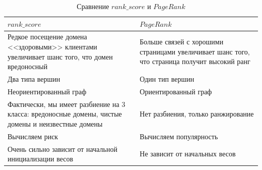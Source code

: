 \documentclass[a4paper,14pt]{extreport} %
\begin{document}
\begin{table}[H]
\caption{Сравнение $rank\_score$ и $PageRank$}\label{tab:pr}
\begin{tabular}{|p{8cm}|p{8cm}|}

	\hline
	$rank\_score$                                                                                                                                                                       & $PageRank$                                                                                                                                                                  \\ \hline
	Редкое посещение домена <<здоровыми>> клиентами увеличивает шанс того, что домен вредоносный           & Больше связей с хорошими страницами увеличивает шанс того, что страница получит высокий ранг \\ \hline 
	Два типа вершин                                                                                                                                                        & Один тип вершин                                                                                                                                                \\ \hline
	Неориентированный граф                                                                                                                                         & Ориентированный граф                                                                                                                                     \\ \hline
	Фактически, мы имеет разбиение на 3 класса: вредоносные домены, чистые домены и неизвестные домены & Нет разбиения, только ранжирование                                                                                                            \\ \hline
	Вычисляем риск                                                                                                                                                         & Вычисляем популярность                                                                                                                                 \\ \hline
	Очень сильно зависит от начальной инициализации весов                                                                                & Не зависит от начальных весов                                                                                                                      \\ \hline
\end{tabular}
\\ 
\end{table}
\end{document}
